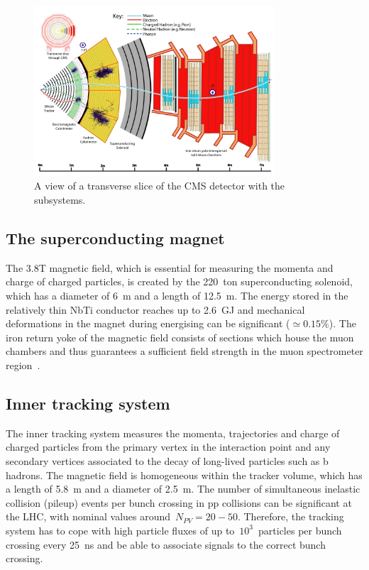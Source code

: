 \begin{figure}
\begin{centering}
\includegraphics[width=0.8\textwidth]{figures/exp/cms_slice.pdf}
\caption{A view of a transverse slice of the CMS detector with the subsystems.}
\label{fig:cms_slice}
\end{centering}
\end{figure}

\subsection{The superconducting magnet}
The 3.8T magnetic field, which is essential for measuring the momenta and charge of charged particles, is created by the 220~ton superconducting solenoid, which has a diameter of 6~m and a length of 12.5~m. The energy stored in the relatively thin NbTi conductor reaches up to 2.6~GJ and mechanical deformations in the magnet during energising can be significant ($\simeq 0.15\%$). The iron return yoke of the magnetic field consists of sections which house the muon chambers and thus guarantees a sufficient field strength in the muon spectrometer region~\cite{Chatrchyan:2008aa}.

\subsection{Inner tracking system}
The inner tracking system measures the momenta, trajectories and charge of charged particles from the primary vertex in the interaction point and any secondary vertices associated to the decay of long-lived particles such as b hadrons. The magnetic field is homogeneous within the tracker volume, which has a length of 5.8~m and a diameter of 2.5~m. The number of simultaneous inelastic collision (pileup) events per bunch crossing in pp collisions can be significant at the LHC, with nominal values around~$N_{PV} = 20-50$. Therefore, the tracking system has to cope with high particle fluxes of up to~$10^3$~particles per bunch crossing every 25~ns and be able to associate signals to the correct bunch crossing.

